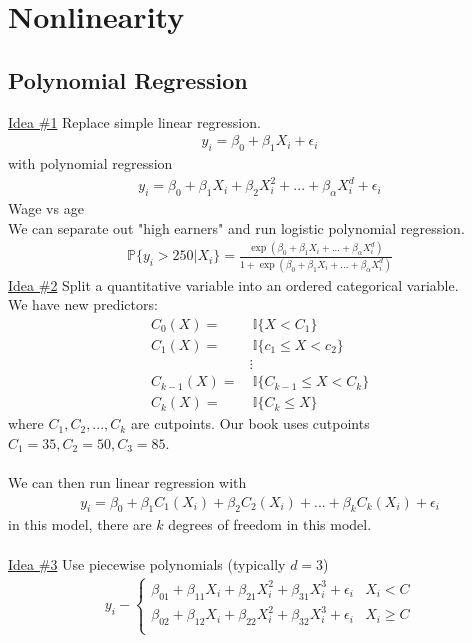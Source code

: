 \documentclass[12pt, letterpaper]{article}
\begin{document}
\section{Nonlinearity}
\subsection{Polynomial Regression}
\underline{Idea \#1} Replace simple linear regression.
\begin{align*}
    y_i = \beta_0 + \beta_1X_i + \epsilon_i
\end{align*}
with polynomial regression
\begin{align*}
    y_i = \beta_0 + \beta_1X_i + \beta_2X_i^2 + ... + \beta_\alpha X_i^d + \epsilon_i
\end{align*}
 Wage vs age \\
We can separate out "high earners" and run logistic polynomial regression.
\begin{align*}
    \mathbb{P}\{y_i > 250 | X_i\} = \frac{\exp(\beta_0+\beta_1X_i+...+\beta_\alpha X_i^d)}{1+ \exp(\beta_0+\beta_1X_i+...+\beta_\alpha X_i^d)}
\end{align*}
\underline{Idea \#2} Split a quantitative variable into an ordered categorical variable. \\
We have new predictors:
\begin{align*}
    C_0(X) =&\ \mathbb{I} \{X < C_1\} \\
    C_1(X) =&\ \mathbb{I} \{c_1 \le X < c_2\} \\
    &\vdots \\ 
    C_{k-1}(X) =&\ \mathbb{I} \{C_{k-1} \le X < C_k\} \\
    C_k(X) =&\ \mathbb{I} \{C_k \le X\}
\end{align*}
where $C_1, C_2, ..., C_k$ are cutpoints. Our book uses cutpoints $C_1 = 35, C_2 = 50, C_3 = 85$. \\ \\
We can then run linear regression with 
\begin{align*}
    y_i = \beta_0 + \beta_1C_1(X_i) + \beta_2C_2(X_i) + ... + \beta_{k}C_k(X_i) + \epsilon_i
\end{align*}
in this model, there are $k$ degrees of freedom in this model. \\ \\
\underline{Idea \#3} Use piecewise polynomials (typically $d = 3$)
\begin{align*}
    y_i - \begin{cases}
        \beta_{01} + \beta_{11}X_i + \beta_{21}X_i^2 + \beta_{31}X_i^3 + \epsilon_i & X_i < C \\
        \beta_{02} + \beta_{12}X_i + \beta_{22}X_i^2 + \beta_{32}X_i^3 + \epsilon_i & X_i \ge C \\
    \end{cases}
\end{align*}
\end{document}
